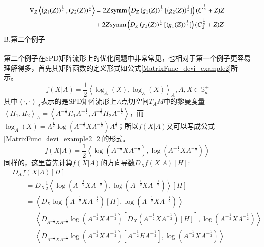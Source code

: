 \begin{equation}
\label{devi_power_metric_final}
\begin{split}
\nabla_{Z}\left<\left(g_{1}(Z)\right)^{\frac{1}{n}},\left(g_{2}(Z)\right)^{\frac{1}{n}}\right>&=2Z{\rm symm}\left(D_{Z}\left(g_{1}(Z)\right)^{\frac{1}{n}}[\left(g_{2}(Z)\right)^{\frac{1}{n}}]\right)(C_{1}^{\frac{1}{n}}+Z)Z\\
&+2Z{\rm symm}\left(D_{Z}\left(g_{2}(Z)\right)^{\frac{1}{n}}[\left(g_{1}(Z)\right)^{\frac{1}{n}}]\right)(C_{2}^{\frac{1}{n}}+Z)Z
\end{split}
\end{equation}
{\heiti B.第二个例子}\\\\
第二个例子在SPD矩阵流形上的优化问题中非常常见，也相对于第一个例子更容易理解得多，首先其矩阵函数的定义形式如公式\ref{MatrixFunc_devi_example2}所示。
\begin{equation}
\label{MatrixFunc_devi_example2}
f(X|A)=\frac{1}{2}\left<\log_{A}(X),\log_{A}(X)\right>_A,A,X\in \mathbb{S}_{d}^{+}
\end{equation}
其中$\left<\cdot,\cdot\right>_A$表示的是SPD矩阵流形上$A$点切空间$T_{A}M$中的黎曼度量$\left<H_1,H_2\right>_A=\left<A^{-\frac{1}{2}}H_1A^{-\frac{1}{2}},A^{-\frac{1}{2}}H_2A^{-\frac{1}{2}}\right>$，而$\log_A(X)=A^{\frac{1}{2}}\log(A^{-\frac{1}{2}}XA^{-\frac{1}{2}})A^{\frac{1}{2}}$；所以$f(X|A)$又可以写成公式\ref{MatrixFunc_devi_example2_2}的形式。
\begin{equation}
\label{MatrixFunc_devi_example2_2}
f(X|A)=\frac{1}{2}\left<\log(A^{-\frac{1}{2}}XA^{-\frac{1}{2}}),\log(A^{-\frac{1}{2}}XA^{-\frac{1}{2}})\right>
\end{equation}
同样的，这里首先计算$f(X|A)$的方向导数$D_{X}f(X|A)[H]$:
\begin{equation}
\label{AIM_CrossTerm_direction_devi}
\begin{split}
&D_{X}f(X|A)[H]\\
&~~~~~~~~~=D_{X}\frac{1}{2}\left<\log(A^{-\frac{1}{2}}XA^{-\frac{1}{2}}),\log(A^{-\frac{1}{2}}XA^{-\frac{1}{2}})\right>[H]\\
&~~~~~~~~~=\left<D_{X}\log(A^{-\frac{1}{2}}XA^{-\frac{1}{2}})[H],\log(A^{-\frac{1}{2}}XA^{-\frac{1}{2}})\right>\\
&~~~~~~~~~=\left<D_{A^{-\frac{1}{2}}XA^{-\frac{1}{2}}}\log(A^{-\frac{1}{2}}XA^{-\frac{1}{2}})[D_{X}(A^{-\frac{1}{2}}XA^{-\frac{1}{2}})[H]],\log(A^{-\frac{1}{2}}XA^{-\frac{1}{2}})\right>\\
&~~~~~~~~~=\left<D_{A^{-\frac{1}{2}}XA^{-\frac{1}{2}}}\log(A^{-\frac{1}{2}}XA^{-\frac{1}{2}})[A^{-\frac{1}{2}}HA^{-\frac{1}{2}}],\log(A^{-\frac{1}{2}}XA^{-\frac{1}{2}})\right>\\
\end{split}
\end{equation}
